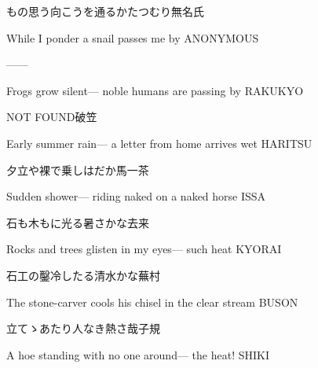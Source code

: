 \begin{haiku}
    {もの思う向こうを通るかたつむり}\hfill{\FH 無名氏}

    \vin{} While I ponder
    \vin{} \vin{} a snail
    \vin{} \vin{} \vin{} passes me by \hspace{\fill} ANONYMOUS
\end{haiku}

\begin{haiku}
   ---\hfill{---}

    \vin{} Frogs grow silent---
    \vin{} \vin{} noble humans
    \vin{} \vin{} \vin{} are passing by \hspace{\fill} RAKUKYO
\end{haiku}

\begin{haiku}
    {NOT FOUND}\hfill{\FH 破笠}

    \vin{} Early summer rain---
    \vin{} \vin{} a letter from home
    \vin{} \vin{} \vin{} arrives wet \hspace{\fill} HARITSU
\end{haiku}

\begin{haiku}
    {\FH 夕立や裸で乗しはだか馬}\hfill{\FH 一茶}

    \vin{} Sudden shower---
    \vin{} \vin{} riding naked
    \vin{} \vin{} \vin{} on a naked horse \hspace{\fill} ISSA
\end{haiku}

\begin{haiku}
    {\FH 石も木もに光る暑さかな}\hfill{\FH 去来}

    \vin{} Rocks and trees
    \vin{} \vin{} glisten in my eyes---
    \vin{} \vin{} \vin{} such heat \hspace{\fill} KYORAI
\end{haiku}

\begin{haiku}
    {\FH 石工の鑿冷したる清水かな}\hfill{\FH 蕪村}

    \vin{} The stone-carver
    \vin{} \vin{} cools his chisel
    \vin{} \vin{} \vin{} in the clear stream \hspace{\fill} BUSON
\end{haiku}

\begin{haiku}
    {\FH {}立てゝあたり人なき熱さ哉}\hfill{\FH 子規}

    \vin{} A hoe standing
    \vin{} \vin{} with no one around---
    \vin{} \vin{} \vin{} the heat! \hspace{\fill} SHIKI
\end{haiku}

